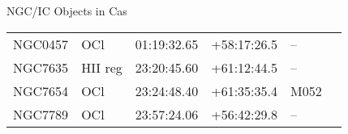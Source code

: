 \begin{block}{NGC/IC Objects in Cas}
  \centering
  \begin{tabularx}{\textwidth}{llrrll} 
    NGC0457 & OCl & 01:19:32.65 & +58:17:26.5  & -- \\ 
    NGC7635 & HII reg & 23:20:45.60 & +61:12:44.5  & -- \\ 
    NGC7654 & OCl & 23:24:48.40 & +61:35:35.4  & M052 \\ 
    NGC7789 & OCl & 23:57:24.06 & +56:42:29.8  & -- \\ 
  \end{tabularx}
\end{block}